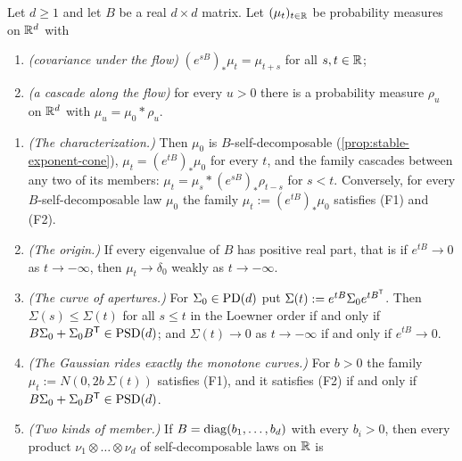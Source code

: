 \begin{proposition}
\label{prop:one-parameter-families}
\leanok
Let $d \ge 1$ and let $B$ be a real $d \times d$ matrix. Let $(\mu_t)_{t\in\mathbb{R}}$ be probability
measures on $\mathbb{R}^d$ with
\begin{enumerate}
\item[(F1)] \emph{(covariance under the flow)} $(e^{sB})_*\mu_t = \mu_{t+s}$ for all $s, t \in \mathbb{R}$;
\item[(F2)] \emph{(a cascade along the flow)} for every $u > 0$ there is a probability measure
$\rho_u$ on $\mathbb{R}^d$ with $\mu_u = \mu_0 * \rho_u$.
\end{enumerate}
\begin{enumerate}
\item \emph{(The characterization.)} Then $\mu_0$ is $B$-self-decomposable
(\ref{prop:stable-exponent-cone}), $\mu_t = (e^{tB})_*\mu_0$ for every $t$, and the family cascades
between any two of its members: $\mu_t = \mu_s * (e^{sB})_*\rho_{t-s}$ for $s < t$. Conversely, for
every $B$-self-decomposable law $\mu_0$ the family $\mu_t := (e^{tB})_*\mu_0$ satisfies (F1) and
(F2).
\item \emph{(The origin.)} If every eigenvalue of $B$ has positive real part, that is if
$e^{tB} \to 0$ as $t \to -\infty$, then $\mu_t \to \delta_0$ weakly as $t \to -\infty$.
\item \emph{(The curve of apertures.)} For $\Sigma_0 \in \mathrm{PD}(d)$ put
$\Sigma(t) := e^{tB}\Sigma_0e^{tB^{\mathsf{T}}}$. Then $\Sigma(s) \le \Sigma(t)$ for all $s \le t$ in the
Loewner order if and only if $B\Sigma_0 + \Sigma_0B^{\mathsf{T}} \in \mathrm{PSD}(d)$; and $\Sigma(t) \to 0$ as
$t \to -\infty$ if and only if $e^{tB} \to 0$.
\item \emph{(The Gaussian rides exactly the monotone curves.)} For $b > 0$ the family
$\mu_t := N(0, 2b\,\Sigma(t))$ satisfies (F1), and it satisfies (F2) if and only if
$B\Sigma_0 + \Sigma_0B^{\mathsf{T}} \in \mathrm{PSD}(d)$.
\item \emph{(Two kinds of member.)} If $B = \operatorname{diag}(b_1,\dots,b_d)$ with every $b_i > 0$, then every
product $\nu_1 \otimes \dots \otimes \nu_d$ of self-decomposable laws on $\mathbb{R}$ is

\end{enumerate}
\end{proposition}

